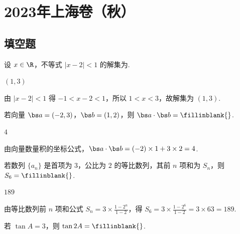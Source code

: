 ﻿\chapter{2023年上海卷（秋）}

\section{填空题}

\begin{problem}
设 \(x\in\R\)，不等式 \(\left|x-2\right|<1\) 的解集为\fillinblank{}.
\end{problem}

\begin{answer}
\(\left(1,3\right)\)
\end{answer}

\begin{solution}
由 \(\left|x-2\right|<1\) 得 \(-1<x-2<1\)，所以 \(1<x<3\)，故解集为 \(\left(1,3\right)\).
\end{solution}

\begin{problem}
若向量 \(\bs a=\left(-2,3\right)\)，\(\bs b=\left(1,2\right)\)，则 \(\bs a\cdot\bs b=\fillinblank{}\).
\end{problem}

\begin{answer}
\(4\)
\end{answer}

\begin{solution}
由向量数量积的坐标公式，\(\bs a\cdot\bs b=\left(-2\right)\times 1+3\times 2=4\).
\end{solution}

\begin{problem}
若数列 \(\{a_n\}\) 是首项为 \(3\)，公比为 \(2\) 的等比数列，其前 \(n\) 项和为 \(S_n\)，则 \(S_6=\fillinblank{}\).
\end{problem}

\begin{answer}
\(189\)
\end{answer}

\begin{solution}
由等比数列前 \(n\) 项和公式 \(S_n=3\times \frac{1-2^n}{1-2}\)，得 \(S_6=3\times \frac{1-2^6}{1-2}=3\times 63=189\).
\end{solution}

\begin{problem}
若 \(\tan A=3\)，则 \(\tan 2A=\fillinblank{}\).
\end{problem}

